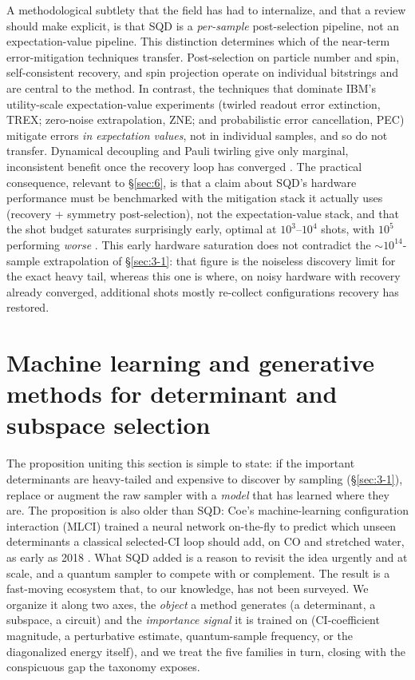\documentclass[onecolumn,a4paper]{quantumarticle}
\begin{document}
A methodological subtlety that the field has had to internalize, and that a review should make explicit, is that SQD is a \emph{per-sample} post-selection pipeline, not an expectation-value pipeline. This distinction determines which of the near-term error-mitigation techniques transfer. Post-selection on particle number and spin, self-consistent recovery, and spin projection operate on individual bitstrings and are central to the method. In contrast, the techniques that dominate IBM's utility-scale expectation-value experiments (twirled readout error extinction, TREX; zero-noise extrapolation, ZNE; and probabilistic error cancellation, PEC) mitigate errors \emph{in expectation values}, not in individual samples, and so do not transfer. Dynamical decoupling and Pauli twirling give only marginal, inconsistent benefit once the recovery loop has converged \cite{bhuiyan2026}. The practical consequence, relevant to \S\ref{sec:6}, is that a claim about SQD's hardware performance must be benchmarked with the mitigation stack it actually uses (recovery + symmetry post-selection), not the expectation-value stack, and that the shot budget saturates surprisingly early, optimal at $10^3$--$10^4$ shots, with $10^5$ performing \emph{worse} \cite{bhuiyan2026}. This early hardware saturation does not contradict the ${\sim}10^{14}$-sample extrapolation of \S\ref{sec:3-1}: that figure is the noiseless discovery limit for the exact heavy tail, whereas this one is where, on noisy hardware with recovery already converged, additional shots mostly re-collect configurations recovery has restored.


\section{Machine learning and generative methods for determinant and subspace selection}\label{sec:4}

The proposition uniting this section is simple to state: if the important determinants are heavy-tailed and expensive to discover by sampling (\S\ref{sec:3-1}), replace or augment the raw sampler with a \emph{model} that has learned where they are. The proposition is also older than SQD: Coe's machine-learning configuration interaction (MLCI) trained a neural network on-the-fly to predict which unseen determinants a classical selected-CI loop should add, on CO and stretched water, as early as 2018 \cite{coe2018,coe2019}. What SQD added is a reason to revisit the idea urgently and at scale, and a quantum sampler to compete with or complement. The result is a fast-moving ecosystem that, to our knowledge, has not been surveyed. We organize it along two axes, the \emph{object} a method generates (a determinant, a subspace, a circuit) and the \emph{importance signal} it is trained on (CI-coefficient magnitude, a perturbative estimate, quantum-sample frequency, or the diagonalized energy itself), and we treat the five families in turn, closing with the conspicuous gap the taxonomy exposes.
\end{document}
